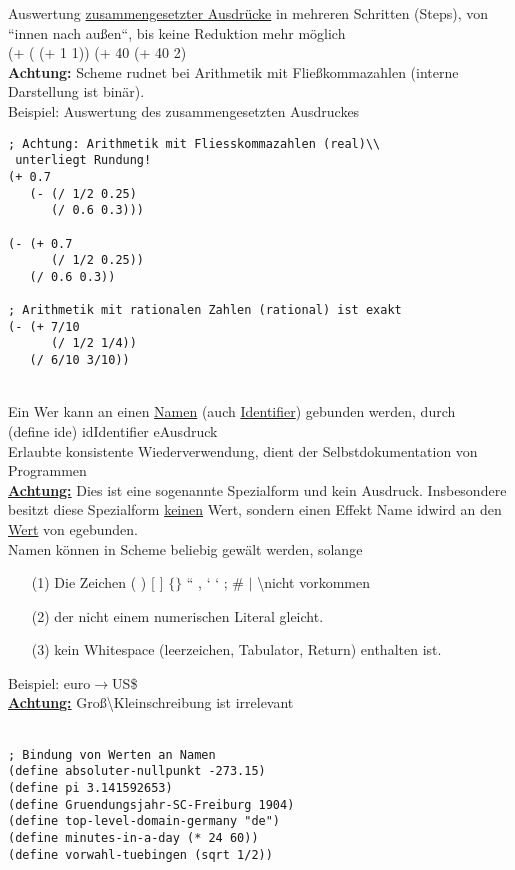 Auswertung \underline{zusammengesetzter Ausdr\"ucke} in mehreren Schritten (Steps), von ``innen nach au\ss en``, bis keine Reduktion mehr m\"oglich\\
(+ (  (+ 1 1)) \eval (+ 40  \eval (+ 40 2) \\
\textbf{Achtung:} Scheme rudnet bei Arithmetik mit Flie\ss kommazahlen (interne Darstellung ist bin\"ar).\\
Beispiel: Auswertung des zusammengesetzten Ausdruckes 
\begin{lstlisting}[frame=single]
; Achtung: Arithmetik mit Fliesskommazahlen (real)\\
 unterliegt Rundung!
(+ 0.7
   (- (/ 1/2 0.25)
      (/ 0.6 0.3)))

(- (+ 0.7
      (/ 1/2 0.25))
   (/ 0.6 0.3))

; Arithmetik mit rationalen Zahlen (rational) ist exakt
(- (+ 7/10
      (/ 1/2 1/4))
   (/ 6/10 3/10))
\end{lstlisting}
\linie\\
Ein Wer kann an einen \underline{Namen} (auch \underline{Identifier}) gebunden werden, durch \\
(define \auf id\zu \auf e\zu) \hspace*{1.5cm} \auf id\zu Identifier \auf e\zu Ausdruck\\
Erlaubte konsistente Wiederverwendung, dient der Selbstdokumentation von Programmen\\
\textbf{\underline{Achtung:}} Dies ist eine sogenannte Spezialform und kein Ausdruck. Insbesondere besitzt diese Spezialform \underline{keinen} Wert, sondern einen Effekt Name \auf id\zu wird an den \underline{Wert} von \auf e\zu gebunden. \\
Namen k\"onnen in Scheme beliebig gew\"alt werden, solange
\begin{enumerate}
\item[(1)] Die Zeichen ( ) $[$ $]$ $\{ \}$ `` , ` ` ; \# $\mid$ \textbackslash nicht vorkommen
\item[(2)] der nicht einem numerischen Literal gleicht.
\item[(3)] kein Whitespace (leerzeichen, Tabulator, Return) enthalten ist.
\end{enumerate}
Beispiel: euro$\rightarrow$US\$\\
\underline{\textbf{Achtung:}} Gro\ss \textbackslash Kleinschreibung ist irrelevant\\
\linie\\
\begin{lstlisting}[frame=single]
; Bindung von Werten an Namen
(define absoluter-nullpunkt -273.15)
(define pi 3.141592653)
(define Gruendungsjahr-SC-Freiburg 1904)
(define top-level-domain-germany "de")
(define minutes-in-a-day (* 24 60))
(define vorwahl-tuebingen (sqrt 1/2))
\end{lstlisting}
